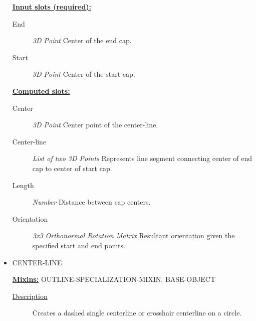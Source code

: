 \documentclass [11pt]{book}
\begin{document}
\begin{itemize}
\textbf{
\underline{Input slots (required):}}

\begin{description}

\item [End]
\emph{3D Point} Center of the end cap.


\item [Start]
\emph{3D Point} Center of the start cap.


\end{description}






\textbf{
\underline{Computed slots:}}

\begin{description}

\item [Center]
\emph{3D Point} Center point of the center-line.


\item [Center-line]
\emph{List of two 3D Points} Represents line segment connecting center of end cap to center of start cap.


\item [Length]
\emph{Number} Distance between cap centers.


\item [Orientation]
\emph{3x3 Orthonormal Rotation Matrix} Resultant orientation given the specified start and end points.


\end{description}







\item {}CENTER-LINE


\textbf{
\underline{Mixins:}} OUTLINE-SPECIALIZATION-MIXIN, BASE-OBJECT





\begin{description}

\item [
\underline{Description}]


Creates a dashed single centerline or crosshair centerline on a circle.




\end{description}
\end{itemize}
\end{document}
